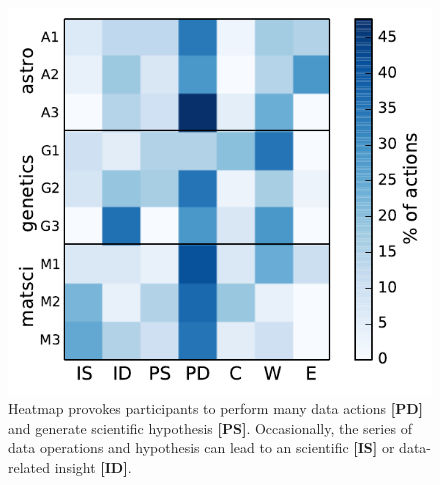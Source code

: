 \begin{figure}[ht!]
    \centering
    \vspace{-10pt}
    \includegraphics[width=0.7\columnwidth]{figures/result1.pdf}
    \vspace{-6pt}\caption{Heatmap  \zv provokes participants to perform many data actions \textbf{[PD]} and generate scientific hypothesis \textbf{[PS]}. Occasionally, the series of data operations and hypothesis can lead to an scientific \textbf{[IS]} or data-related insight \textbf{[ID]}.}
    \vspace{-10pt}
    \label{action_heatmap}
\end{figure} 

